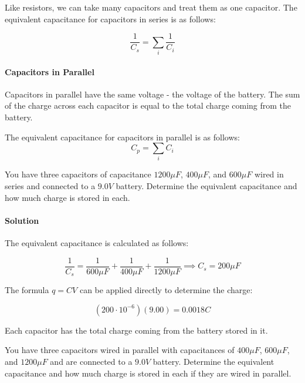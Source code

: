 \documentclass{scrartcl}
\theoremstyle{definition}
\begin{document}
	\begin{theorem}
		Like resistors, we can take many capacitors and treat them as one capacitor. The equivalent capacitance for capacitors in series is as follows:
		
		$$
		\frac{1}{C_s} = \sum_i \frac{1}{C_i}
		$$
	\end{theorem}
	
	\paragraph{Capacitors in Parallel} Capacitors in parallel have the same voltage - the voltage of the battery. The sum of the charge across each capacitor is equal to the total charge coming from the battery.
	
	\begin{theorem}
		The equivalent capacitance for capacitors in parallel is as follows:
		$$
		C_p = \sum_i C_i
		$$
	\end{theorem}
	
	\begin{example}
		You have three capacitors of capacitance $1200 \mu F$, $400 \mu F$, and $600 \mu F$ wired in series and connected to a $9.0V$ battery. Determine the equivalent capacitance and how much charge is stored in each.
	\end{example}
	
	\paragraph{Solution} The equivalent capacitance is calculated as follows:
	
	$$
	\frac{1}{C_s} = \frac{1}{600 \mu F} + \frac{1}{400 \mu F} + \frac{1}{1200 \mu F} \implies C_s = \boxed{200 \mu F}
	$$
	
	\noindent The formula $q = CV$ can be applied directly to determine the charge:
	
	$$
	(200 \cdot 10^{-6})(9.00) = \boxed{0.0018 C}
	$$
	
	\noindent Each capacitor has the total charge coming from the battery stored in it.
	
	\begin{example}
		You have three capacitors wired in parallel with capacitances of $400 \mu F$, $600 \mu F$, and $1200 \mu F$ and are connected to a $9.0V$ battery. Determine the equivalent capacitance and how much charge is stored in each if they are wired in parallel.
	\end{example}
	
\end{document}
